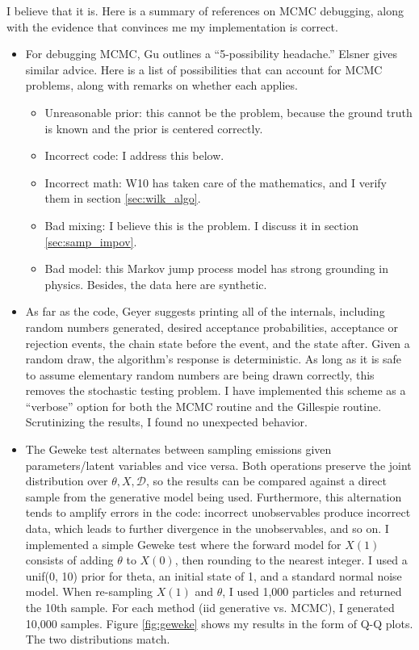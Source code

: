 \documentclass{article}
\begin{document}
I believe that it is. Here is a summary of references on MCMC debugging, along with the evidence that convinces me my implementation is correct.
\begin{itemize}
\item For debugging MCMC, Gu \cite{gu_debug_MCMC} outlines a ``5-possibility headache.'' Elsner \cite{elsner_debug_MCMC} gives similar advice. Here is a list of possibilities that can account for MCMC problems, along with remarks on whether each applies. 
\begin{itemize}
\item Unreasonable prior: this cannot be the problem, because the ground truth is known and the prior is centered correctly.
\item Incorrect code: I address this below.
\item Incorrect math: W10 has taken care of the mathematics, and I verify them in section \ref{sec:wilk_algo}.
\item Bad mixing: I believe this is the problem. I discuss it in section \ref{sec:samp_impov}. 
\item Bad model: this Markov jump process model has strong grounding in physics. Besides, the data here are synthetic.
\end{itemize}

\item As far as the code, Geyer \cite{geyer_mcmc_debug} suggests printing all of the internals, including random numbers generated, desired acceptance probabilities, acceptance or rejection events, the chain state before the event, and the state after. Given a random draw, the algorithm's response is deterministic. As long as it is safe to assume elementary random numbers are being drawn correctly, this removes the stochastic testing problem. I have implemented this scheme as a ``verbose'' option for both the MCMC routine and the Gillespie routine. Scrutinizing the results, I found no unexpected behavior.

\item The Geweke test \cite{geweke2004getting} alternates between sampling emissions given parameters/latent variables and vice versa. Both operations preserve the joint distribution over $\theta, X, \mathcal{D}$, so the results can be compared against a direct sample from the generative model being used. Furthermore, this alternation tends to amplify errors in the code: incorrect unobservables produce incorrect data, which leads to further divergence in the unobservables, and so on. I implemented a simple Geweke test where the forward model for $X(1)$ consists of adding $\theta$ to $X(0)$, then rounding to the nearest integer. I used a unif(0, 10) prior for theta, an initial state of 1, and a standard normal noise model. When re-sampling $X(1)$ and $\theta$, I used 1,000 particles and returned the 10th sample. For each method (iid generative vs. MCMC), I generated 10,000 samples. Figure \ref{fig:geweke} shows my results in the form of Q-Q plots. The two distributions match.


\end{itemize}
\end{document}
